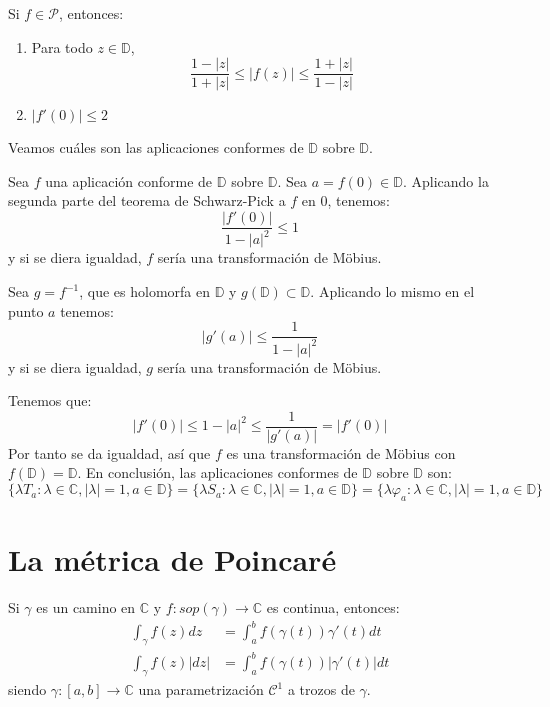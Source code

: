 \begin{theorem}
    Si $f \in \mathcal{P}$, entonces:
    \begin{enumerate}
        \item Para todo $z \in \mathbb{D}$,
              $$\frac{1-|z|}{1+|z|} \leq |f(z)| \leq \frac{1+|z|}{1-|z|}$$
        \item $|f'(0)| \leq 2$
    \end{enumerate}
\end{theorem}

Veamos cuáles son las aplicaciones conformes de $\mathbb{D}$ sobre $\mathbb{D}$.

Sea $f$ una aplicación conforme de $\mathbb{D}$ sobre $\mathbb{D}$.
Sea $a = f(0) \in \mathbb{D}$.
Aplicando la segunda parte del teorema de Schwarz-Pick a $f$ en 0, tenemos:
$$\frac{|f'(0)|}{1-|a|^2} \leq 1$$
y si se diera igualdad, $f$ sería una transformación de Möbius.

Sea $g = f^{-1}$, que es holomorfa en $\mathbb{D}$ y $g(\mathbb{D}) \subset \mathbb{D}$.
Aplicando lo mismo en el punto $a$ tenemos:
$$|g'(a)| \leq \frac{1}{1-|a|^2}$$
y si se diera igualdad, $g$ sería una transformación de Möbius.

Tenemos que:
$$|f'(0)| \leq 1-|a|^2 \leq \frac{1}{|g'(a)|} = |f'(0)|$$
Por tanto se da igualdad, así que $f$ es una transformación de Möbius con $f(\mathbb{D}) = \mathbb{D}$.
En conclusión, las aplicaciones conformes de $\mathbb{D}$ sobre $\mathbb{D}$ son:
$$\{\lambda T_a : \lambda \in \mathbb{C}, |\lambda| = 1, a \in \mathbb{D}\} = \{\lambda S_a : \lambda \in \mathbb{C}, |\lambda| = 1, a \in \mathbb{D}\} = \{\lambda \varphi_a : \lambda \in \mathbb{C}, |\lambda| = 1, a \in \mathbb{D}\}$$

\section{La métrica de Poincaré}
Si $\gamma$ es un camino en $\mathbb{C}$ y $f: sop(\gamma) \to \mathbb{C}$ es continua, entonces:
\begin{align*}
    \int_\gamma f(z)dz   & = \int_a^b f(\gamma(t))\gamma'(t)dt   \\
    \int_\gamma f(z)|dz| & = \int_a^b f(\gamma(t))|\gamma'(t)|dt
\end{align*}
siendo $\gamma: [a, b] \to \mathbb{C}$ una parametrización $\mathcal{C}^1$ a trozos de $\gamma$.

